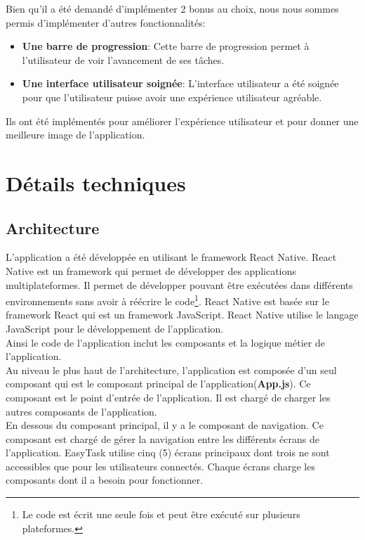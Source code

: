 \documentclass[12pt]{article}
\begin{document}
        Bien qu'il a été demandé d'implémenter 2 bonus au choix, nous nous sommes permis d'implémenter d'autres fonctionnalités:
        \begin{itemize}
            \item \textbf{Une barre de progression}: Cette barre de progression permet à l'utilisateur de voir l'avancement de ses tâches.
            \item \textbf{Une interface utilisateur soignée}: L'interface utilisateur a été soignée pour que l'utilisateur puisse avoir une expérience utilisateur agréable.
        \end{itemize}
        Ils ont été implémentés pour améliorer l'expérience utilisateur et pour donner une meilleure image de l'application.

        \section{Détails techniques}\label{sec:details-techniques}

        \subsection{Architecture}\label{subsec:architecture}
        L'application a été développée en utilisant le framework React Native. React Native est un framework qui permet de développer des applications multiplateformes.
        Il permet de développer pouvant être exécutées dans différents environnements sans avoir à réécrire le code\footnote{Le code est écrit une seule fois et peut être exécuté sur plusieurs plateformes.}.
        React Native est basée sur le framework React qui est un framework JavaScript. React Native utilise le langage JavaScript pour le développement de l'application.\\
        Ainsi le code de l'application inclut les composants et la logique métier de l'application.\\

        Au niveau le plus haut de l'architecture, l'application est composée d'un seul composant qui est le composant principal de l'application(\textbf{App.js}).
        Ce composant est le point d'entrée de l'application. Il est chargé de charger les autres composants de l'application.\\
        En dessous du composant principal, il y a le composant de navigation. Ce composant est chargé de gérer la navigation entre les différents écrans de l'application.
        EasyTask utilise cinq (5) écrans principaux dont trois ne sont accessibles que pour les utilisateurs connectés. Chaque écrans charge
        les composants dont il a besoin pour fonctionner.\\
\end{document}
